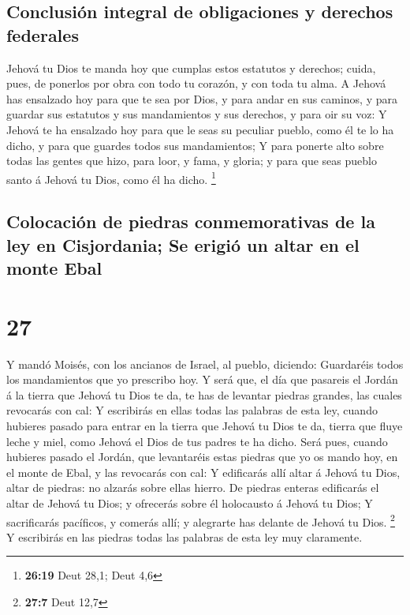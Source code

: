 \hypertarget{conclusiuxf3n-integral-de-obligaciones-y-derechos-federales}{%
\subsection{Conclusión integral de obligaciones y derechos
federales}\label{conclusiuxf3n-integral-de-obligaciones-y-derechos-federales}}

 Jehová tu Dios te manda hoy que cumplas estos estatutos
y derechos; cuida, pues, de ponerlos por obra con todo tu corazón, y con
toda tu alma.  A Jehová has ensalzado hoy para que te sea
por Dios, y para andar en sus caminos, y para guardar sus estatutos y
sus mandamientos y sus derechos, y para oir su voz:  Y
Jehová te ha ensalzado hoy para que le seas su peculiar pueblo, como él
te lo ha dicho, y para que guardes todos sus mandamientos;
 Y para ponerte alto sobre todas las gentes que hizo,
para loor, y fama, y gloria; y para que seas pueblo santo á Jehová tu
Dios, como él ha dicho. \footnote{\textbf{26:19} Deut 28,1; Deut 4,6}

\hypertarget{colocaciuxf3n-de-piedras-conmemorativas-de-la-ley-en-cisjordania-se-erigiuxf3-un-altar-en-el-monte-ebal}{%
\subsection{Colocación de piedras conmemorativas de la ley en
Cisjordania; Se erigió un altar en el monte
Ebal}\label{colocaciuxf3n-de-piedras-conmemorativas-de-la-ley-en-cisjordania-se-erigiuxf3-un-altar-en-el-monte-ebal}}

\hypertarget{section-26}{%
\section{27}\label{section-26}}

 Y mandó Moisés, con los ancianos de Israel, al pueblo,
diciendo: Guardaréis todos los mandamientos que yo prescribo hoy.
 Y será que, el día que pasareis el Jordán á la tierra que
Jehová tu Dios te da, te has de levantar piedras grandes, las cuales
revocarás con cal:  Y escribirás en ellas todas las
palabras de esta ley, cuando hubieres pasado para entrar en la tierra
que Jehová tu Dios te da, tierra que fluye leche y miel, como Jehová el
Dios de tus padres te ha dicho.  Será pues, cuando
hubieres pasado el Jordán, que levantaréis estas piedras que yo os mando
hoy, en el monte de Ebal, y las revocarás con cal:  Y
edificarás allí altar á Jehová tu Dios, altar de piedras: no alzarás
sobre ellas hierro.  De piedras enteras edificarás el
altar de Jehová tu Dios; y ofrecerás sobre él holocausto á Jehová tu
Dios;  Y sacrificarás pacíficos, y comerás allí; y
alegrarte has delante de Jehová tu Dios. \footnote{\textbf{27:7} Deut
  12,7}  Y escribirás en las piedras todas las palabras de
esta ley muy claramente.

